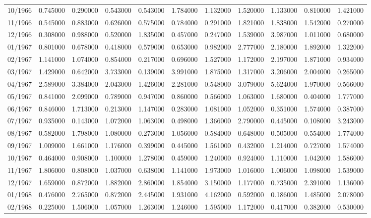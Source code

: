 \begin{tabular}{lrrrrrrrrrr}
10/1966 & 0.745000 & 0.290000 & 0.543000 & 0.543000 & 1.784000 & 1.132000 & 1.520000 & 1.133000 & 0.810000 & 1.421000 \\
11/1966 & 0.545000 & 0.883000 & 0.626000 & 0.575000 & 0.784000 & 0.291000 & 1.821000 & 1.838000 & 1.542000 & 0.270000 \\
12/1966 & 0.308000 & 0.988000 & 0.520000 & 1.835000 & 0.457000 & 0.247000 & 1.539000 & 3.987000 & 1.011000 & 0.680000 \\
01/1967 & 0.801000 & 0.678000 & 0.418000 & 0.579000 & 0.653000 & 0.982000 & 2.777000 & 2.180000 & 1.892000 & 1.322000 \\
02/1967 & 1.141000 & 1.074000 & 0.854000 & 0.217000 & 0.696000 & 1.527000 & 1.172000 & 2.197000 & 1.871000 & 0.934000 \\
03/1967 & 1.429000 & 0.642000 & 3.733000 & 0.139000 & 3.991000 & 1.875000 & 1.317000 & 3.206000 & 2.004000 & 0.265000 \\
04/1967 & 2.589000 & 3.384000 & 2.043000 & 1.426000 & 2.281000 & 0.548000 & 3.079000 & 5.624000 & 1.970000 & 0.566000 \\
05/1967 & 0.841000 & 2.099000 & 0.789000 & 0.947000 & 0.860000 & 0.566000 & 1.063000 & 1.680000 & 0.404000 & 1.777000 \\
06/1967 & 0.846000 & 1.713000 & 0.213000 & 1.147000 & 0.283000 & 1.081000 & 1.052000 & 0.351000 & 1.574000 & 0.387000 \\
07/1967 & 0.935000 & 0.143000 & 1.072000 & 1.063000 & 0.498000 & 1.366000 & 2.790000 & 0.445000 & 0.108000 & 3.243000 \\
08/1967 & 0.582000 & 1.798000 & 1.080000 & 0.273000 & 1.056000 & 0.584000 & 0.648000 & 0.505000 & 0.554000 & 1.774000 \\
09/1967 & 1.009000 & 1.661000 & 1.176000 & 0.399000 & 0.445000 & 1.561000 & 0.432000 & 1.214000 & 0.727000 & 1.574000 \\
10/1967 & 0.464000 & 0.908000 & 1.100000 & 1.278000 & 0.459000 & 1.240000 & 0.924000 & 1.110000 & 1.042000 & 1.586000 \\
11/1967 & 1.806000 & 0.808000 & 1.037000 & 0.638000 & 1.141000 & 1.973000 & 1.016000 & 1.006000 & 1.098000 & 1.539000 \\
12/1967 & 1.659000 & 0.872000 & 1.882000 & 2.860000 & 1.854000 & 3.150000 & 1.177000 & 0.735000 & 2.391000 & 1.136000 \\
01/1968 & 0.476000 & 2.765000 & 0.872000 & 2.445000 & 1.931000 & 4.162000 & 0.592000 & 0.186000 & 1.485000 & 2.078000 \\
02/1968 & 0.225000 & 1.506000 & 1.057000 & 1.263000 & 1.246000 & 1.595000 & 1.172000 & 0.417000 & 0.382000 & 0.530000 \\

\end{tabular}
